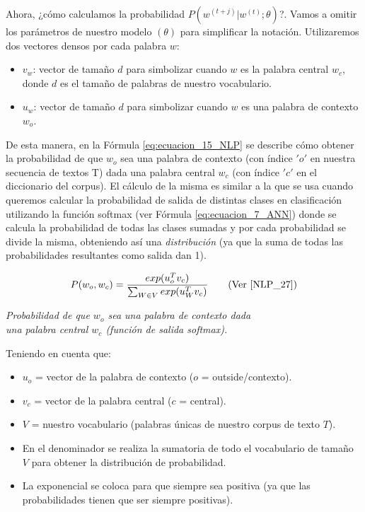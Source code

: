 \documentclass[12pt,a4paper]{article}
\begin{document}
\begin{sloppypar}
Ahora, ¿cómo calculamos la probabilidad $P(w^{(t+j)} | w^{(t)} ; \theta)$?. Vamos a omitir los parámetros de nuestro modelo $(\theta)$ para simplificar la notación. Utilizaremos dos vectores densos por cada palabra $w$:
\begin{itemize}
\item $v_w$: vector de tamaño $d$ para simbolizar cuando $w$ es la palabra central $w_c$, donde $d$ es el tamaño de palabras de nuestro vocabulario.
\item $u_w$: vector de tamaño $d$ para simbolizar cuando $w$ es una palabra de contexto $w_o$.
\end{itemize}

De esta manera, en la Fórmula \ref{eq:ecuacion_15_NLP} se describe cómo obtener la probabilidad de que $w_o$ sea una palabra de contexto (con índice $'o'$ en nuestra secuencia de textos T) dada una palabra central $w_c$ (con índice $'c'$ en el diccionario del corpus). El cálculo de la misma es similar a la que se usa cuando queremos calcular la probabilidad de salida de distintas clases en clasificación utilizando la función softmax (ver Fórmula \ref{eq:ecuacion_7_ANN}) donde se calcula la probabilidad de todas las clases sumadas y por cada probabilidad se divide la misma, obteniendo así una \textit{distribución} (ya que la suma de todas las probabilidades resultantes como salida dan 1). 

\begin{equation}\label{eq:ecuacion_15_NLP}
P(w_o, w_c) = \frac{exp(u_{o}^{T} v_c)}{\sum_{W \in V} exp(u_{W}^{T} v_c)}    \qquad \text{(Ver \cite{NLP_27})}
\end{equation}
\begin{center}
\textit{ Probabilidad de que $w_o$ sea una palabra de contexto dada \\ una palabra central $w_c$ (función de salida softmax).}
\end{center}

Teniendo en cuenta que:
\begin{itemize}
\item $u_o$ = vector de la palabra de contexto ($o$ = outside/contexto).
\item $v_c$ = vector de la palabra central ($c$ = central).
\item $V$ = nuestro vocabulario (palabras únicas de nuestro corpus de texto $T$). 
\item En el denominador se realiza la sumatoria de todo el vocabulario de tamaño $V$ para obtener la distribución de probabilidad.
\item La exponencial se coloca para que siempre sea positiva (ya que las probabilidades tienen que ser siempre positivas). \\
\end{itemize}



\end{sloppypar}
\end{document}
